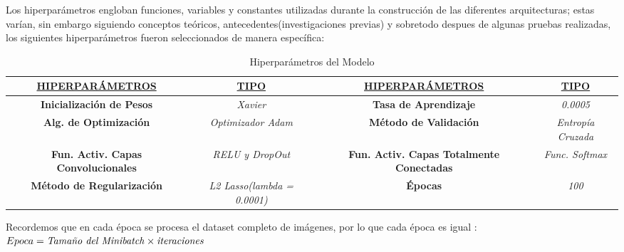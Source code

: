 	Los hiperparámetros engloban funciones, variables y constantes utilizadas durante la construcción de las diferentes arquitecturas; estas varían, sin embargo siguiendo conceptos teóricos, antecedentes(investigaciones previas) y sobretodo despues de algunas pruebas realizadas, los siguientes hiperparámetros fueron seleccionados de manera específica:
		\begin{table}[H]
			\begin{center}
			\caption{\small{Hiperparámetros del Modelo}}
			\begin{tabular}{|>{\scriptsize}c|>{\scriptsize}c|>{\scriptsize}c|>{\scriptsize}c|}
			\hline
			{\ul \textbf{HIPERPARÁMETROS}}  & {\ul \textbf{TIPO}}       & {\ul \textbf{HIPERPARÁMETROS}}        & {\ul \textbf{TIPO}}        \\ \hline
			{\textbf{Inicialización de Pesos}}                     		& {\textit{Xavier}}  				  &
			\textbf{Tasa de Aprendizaje}                                & \textit{0.0005}                    \\ \hline
			\textbf{Alg. de Optimización}                               & \textit{Optimizador Adam}          &
			\textbf{Método de Validación}                               & \textit{Entropía Cruzada}          \\ \hline
			\textbf{Fun. Activ. Capas Convolucionales}        			& \textit{RELU y DropOut}                      &
			\textbf{Fun. Activ. Capas Totalmente Conectadas} 			& \textit{Func. Softmax}           \\ \hline
			\textbf{Método de Regularización}                           &\textit{L2 Lasso(lambda = 0.0001)} &
			\textbf{Épocas}                                             &\textit{100}		 				\\ \hline
			\end{tabular}
			\end{center}
		\end{table}
		\vspace{-1.5em}

		Recordemos que en cada época se procesa el dataset completo de imágenes, por lo que cada época es igual : \begingroup\makeatletter\def\f@size{11}\check@mathfonts	$Epoca = \text{\textit{Tamaño del Minibatch}} \times \text{\textit{iteraciones}}$ \endgroup

